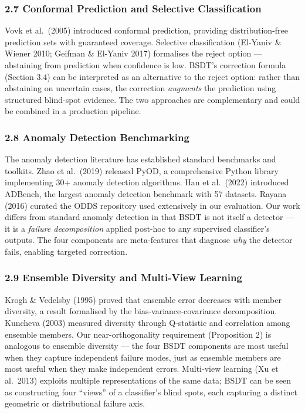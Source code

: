 \documentclass[
  11pt,
]{article}
\begin{document}
\subsubsection{2.7 Conformal Prediction and Selective
Classification}\label{conformal-prediction-and-selective-classification}

Vovk et al.~(2005) introduced conformal prediction, providing
distribution-free prediction sets with guaranteed coverage. Selective
classification (El-Yaniv \& Wiener 2010; Geifman \& El-Yaniv 2017)
formalises the reject option — abstaining from prediction when
confidence is low. BSDT’s correction formula (Section 3.4) can be
interpreted as an alternative to the reject option: rather than
abstaining on uncertain cases, the correction \emph{augments} the
prediction using structured blind-spot evidence. The two approaches are
complementary and could be combined in a production pipeline.

\subsubsection{2.8 Anomaly Detection
Benchmarking}\label{anomaly-detection-benchmarking}

The anomaly detection literature has established standard benchmarks and
toolkits. Zhao et al.~(2019) released PyOD, a comprehensive Python
library implementing 30+ anomaly detection algorithms. Han et al.~(2022)
introduced ADBench, the largest anomaly detection benchmark with 57
datasets. Rayana (2016) curated the ODDS repository used extensively in
our evaluation. Our work differs from standard anomaly detection in that
BSDT is not itself a detector — it is a \emph{failure decomposition}
applied post-hoc to any supervised classifier’s outputs. The four
components are meta-features that diagnose \emph{why} the detector
fails, enabling targeted correction.

\subsubsection{2.9 Ensemble Diversity and Multi-View
Learning}\label{ensemble-diversity-and-multi-view-learning}

Krogh \& Vedelsby (1995) proved that ensemble error decreases with
member diversity, a result formalised by the bias-variance-covariance
decomposition. Kuncheva (2003) measured diversity through Q-statistic
and correlation among ensemble members. Our near-orthogonality
requirement (Proposition 2) is analogous to ensemble diversity — the
four BSDT components are most useful when they capture independent
failure modes, just as ensemble members are most useful when they make
independent errors. Multi-view learning (Xu et al.~2013) exploits
multiple representations of the same data; BSDT can be seen as
constructing four “views” of a classifier’s blind spots, each capturing
a distinct geometric or distributional failure axis.
\end{document}
